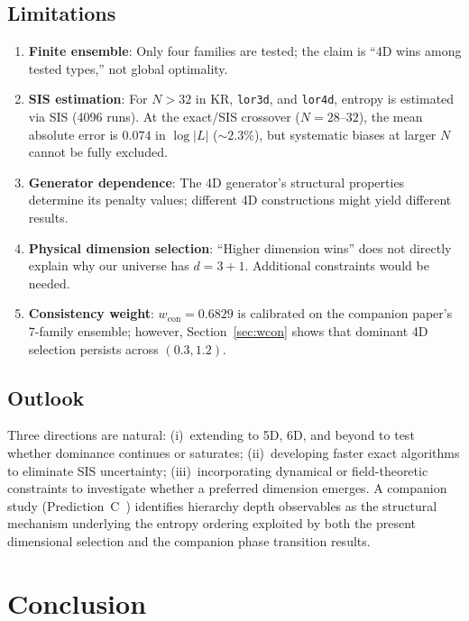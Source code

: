 \documentclass[entropy,article,submit,pdftex,moreauthors]{Definitions/mdpi}
\begin{document}
\subsection{Limitations}

\begin{enumerate}[nosep]
    \item \textbf{Finite ensemble}: Only four families are tested; the claim is ``4D wins among tested types,'' not global optimality.
    \item \textbf{SIS estimation}: For $N > 32$ in KR, \texttt{lor3d}, and \texttt{lor4d}, entropy is estimated via SIS (4096 runs). At the exact/SIS crossover ($N = 28$--$32$), the mean absolute error is $0.074$ in $\log|L|$ ($\sim 2.3\%$), but systematic biases at larger $N$ cannot be fully excluded.
    \item \textbf{Generator dependence}: The 4D generator's structural properties determine its penalty values; different 4D constructions might yield different results.
    \item \textbf{Physical dimension selection}: ``Higher dimension wins'' does not directly explain why our universe has $d = 3{+}1$. Additional constraints would be needed.
    \item \textbf{Consistency weight}: $w_{\text{con}} = 0.6829$ is calibrated on the companion paper's 7-family ensemble; however, Section~\ref{sec:wcon} shows that dominant 4D selection persists across $(0.3, 1.2)$.
\end{enumerate}

\subsection{Outlook}

Three directions are natural: (i)~extending to 5D, 6D, and beyond to test whether dominance continues or saturates; (ii)~developing faster exact algorithms to eliminate SIS uncertainty; (iii)~incorporating dynamical or field-theoretic constraints to investigate whether a preferred dimension emerges. A companion study (Prediction~C~\cite{zhang2026predC}) identifies hierarchy depth observables as the structural mechanism underlying the entropy ordering exploited by both the present dimensional selection and the companion phase transition results.

\section{Conclusion}
\end{document}
